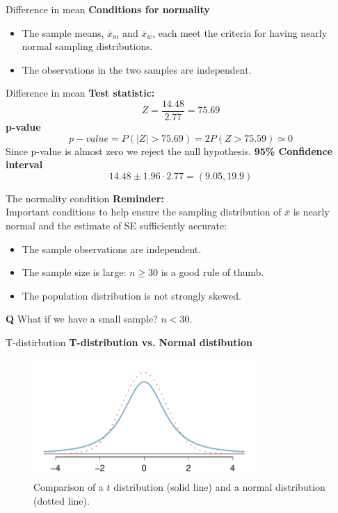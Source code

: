 \documentclass[12pt,a4paper]{beamer}
\begin{document}
\begin{frame}{Difference in mean}
	\textbf{Conditions for normality}
	\begin{itemize}
	\item The sample means, $\bar{x}_m$ and $\bar{x}_w$, each meet the criteria for having nearly normal sampling distributions.
	\item The observations in the two samples are independent.
\end{itemize}
\end{frame}
\begin{frame}{Difference in mean}
	\textbf{Test statistic:}
	\[Z =\frac{14.48}{2.77} = 75.69\]
	\textbf{p-value}
	\[p-value=P(|Z|>75.69)=2P(Z>75.59)\simeq 0\]
	Since p-value is almost zero we reject the null hypothesis. 
\textbf{ 95\% Confidence interval}
\[14.48\pm 1.96\cdot 2.77=(9.05,19.9)\]
\end{frame}
\begin{frame}{The normality condition}
	\textbf{Reminder:}\\
	Important conditions to help ensure the sampling distribution of $\bar{x}$ is nearly normal and the estimate of SE sufficiently accurate:
	\begin{itemize}
	\setlength{\itemsep}{0mm}
	\item The sample observations are independent.
	\item The sample size is large: $n\geq30$ is a good rule of thumb.
	\item The population distribution is not strongly skewed. 
	\end{itemize}\vspace{0.3cm}
	\textbf{Q} What if we have a small sample? $n<30.$
\end{frame}
\begin{frame}{T-distirbution}
	\textbf{T-distribution vs. Normal distibution}
	\begin{figure}
	\centering
	\includegraphics[height=45mm]{figures/tDistCompareToNormalDist/tDistCompareToNormalDist}
	\caption{Comparison of a $t$ distribution (solid line) and a normal distribution (dotted line).}
	\end{figure}
\end{frame}
\end{document}
